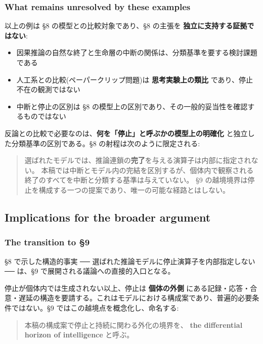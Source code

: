\subsubsection{What remains unresolved by these examples}


以上の例は \S{}8 の模型との比較対象であり、\S{}8 の主張を \textbf{独立に支持する証拠ではない}:

\begin{itemize}
\item 因果推論の自然な終了と生命層の中断の関係は、分類基準を要する検討課題である
\item 人工系との比較(ペーパークリップ問題)は \textbf{思考実験上の類比} であり、停止不在の観測ではない
\item 中断と停止の区別は \S{}8 の模型上の区別であり、その一般的妥当性を確認するものではない
\end{itemize}

反論との比較で必要なのは、\textbf{何を「停止」と呼ぶかの模型上の明確化} と独立した分類基準の区別である。\S{}8 の射程は次のように限定される:

\begin{quote}
選ばれたモデルでは、推論連鎖の\textbf{完了}を与える演算子は内部に指定されない。
本稿では中断とモデル内の完結を区別するが、個体内で観察される終了のすべてを中断と分類する基準は与えていない。
\S{}9 の越境境界は停止を構成する一つの提案であり、唯一の可能な経路とはしない。
\end{quote}

\subsection{Implications for the broader argument}


\subsubsection{The transition to \S{}9}


\S{}8 で示した構造的事実 ── 選ばれた推論モデルに停止演算子を内部指定しない ── は、\S{}9 で展開される議論への直接的入口となる。

停止が個体内では生成されない以上、停止は \textbf{個体の外側} にある記録・応答・合意・遅延の構造を要請する。これはモデルにおける構成案であり、普遍的必要条件ではない。\S{}9 ではこの越境点を概念化し、命名する:

\begin{quote}
本稿の構成案で停止と持続に関わる外化の境界を、
\textbf{the differential horizon of intelligence} と呼ぶ。
\end{quote}


